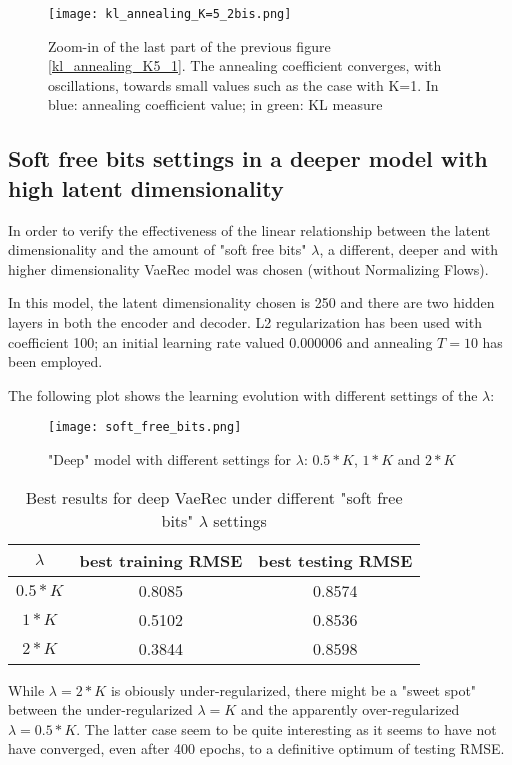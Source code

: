 \begin{figure}[H]
\centering
\texttt{[image: kl\_annealing\_K=5\_2bis.png]}
\caption{Zoom-in of the last part of the previous figure \ref{kl_annealing_K5_1}.  The annealing coefficient converges, with oscillations, towards small values such as the case with K=1.  In blue: annealing coefficient value; in green: KL measure}
\label{kl_annealing2}
\end{figure}

\subsection{Soft free bits settings in a deeper model with high latent dimensionality}
\label{soft_free_bits_deep}

In order to verify the effectiveness of the linear relationship between
the latent dimensionality and the amount of "soft free bits" $\lambda$,
a different, deeper and with higher dimensionality VaeRec model
was chosen (without Normalizing Flows).

In this model, the latent dimensionality chosen is 250 and there are
two hidden layers in both the encoder and decoder.
L2 regularization has been used with coefficient 100; an initial learning rate
valued $0.000006$ and annealing $T=10$ has been employed.

The following plot shows the learning evolution
with different settings of the 
$\lambda$:

\begin{figure}[H]
\centering
\texttt{[image: soft\_free\_bits.png]}
\caption{"Deep" model with different settings for $\lambda$: $0.5*K$, $1*K$ and $2*K$}
\label{soft_free_bits_fig1}
\end{figure}

\begin{table}[H]
\centering
\caption{Best results for deep VaeRec under different "soft free bits" $\lambda$ settings}
 \begin{tabular}{|c | c | c ||} 
 \hline
 $\lambda$ & best training RMSE & best testing RMSE \\ \hline
 $0.5 * K$ & 0.8085 &  0.8574 \\
 $1 * K$ & 0.5102 & 0.8536 \\
 $2 * K$ & 0.3844 & 0.8598
 \\ \hline
\end{tabular}
\end{table}

While $\lambda=2*K$ is obiously under-regularized, there might be a "sweet spot" between the
under-regularized $\lambda=K$ and the apparently over-regularized $\lambda=0.5*K$.
The latter case seem to be quite interesting as it seems to have not have converged, even
after 400 epochs, to a definitive optimum of testing RMSE.
